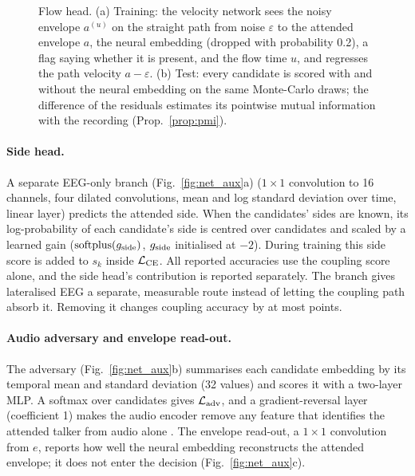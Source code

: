\documentclass[10pt,twocolumn,letterpaper]{article}
\begin{document}
\begin{figure}[t]\centering
\resizebox{\textwidth}{!}{}
\caption{Flow head. (a) Training: the velocity network sees the noisy envelope $a^{(u)}$ on the
straight path from noise $\varepsilon$ to the attended envelope $a$, the neural embedding
(dropped with probability 0.2), a flag saying whether it is present, and the flow time $u$,
and regresses the path velocity $a-\varepsilon$. (b) Test: every candidate is scored with
and without the neural embedding on the same Monte-Carlo draws; the difference of the
residuals estimates its pointwise mutual information with the recording
(Prop.~\ref{prop:pmi}).}\label{fig:net_flow}
\end{figure}

\paragraph{Side head.} A separate EEG-only branch (Fig.~\ref{fig:net_aux}a) ($1{\times}1$ convolution to 16
channels, four dilated convolutions, mean and log standard deviation over time, linear
layer) predicts the attended side. When the candidates' sides are known, its
log-probability of each candidate's side is centred over candidates and scaled by a learned gain ($\mathrm{softplus}(g_{\rm side})$,
$g_{\rm side}$ initialised at $-2$). During training this side score is added to $s_k$ inside
$\mathcal L_{\rm CE}$. All reported accuracies use the coupling score alone, and the side
head's contribution is reported separately. The branch gives lateralised EEG a separate,
measurable route instead of letting the coupling path absorb it. Removing it changes
coupling accuracy by at most \ablOtherMax{} points.

\paragraph{Audio adversary and envelope read-out.} The adversary (Fig.~\ref{fig:net_aux}b) summarises each candidate
embedding by its temporal mean and standard deviation (32 values) and scores it with a
two-layer MLP. A softmax over candidates gives $\mathcal L_{\rm adv}$, and a
gradient-reversal layer (coefficient 1) makes the audio encoder remove any feature that
identifies the attended talker from audio alone \citep{ganin2016domain}. The envelope
read-out, a $1{\times}1$ convolution from $e$, reports how well the neural embedding
reconstructs the attended envelope; it does not enter the decision (Fig.~\ref{fig:net_aux}c).
\end{document}
